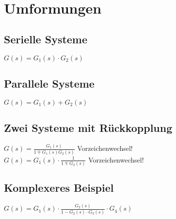 \section{Umformungen}
 \begin{multicols}{2}
	\subsection{Serielle Systeme}
		
		$G(s) = G_1(s) \cdot G_2(s)$
	\subsection{Parallele Systeme}
		
		$G(s) = G_1(s) + G_2(s)$
	\subsection{Zwei Systeme mit Rückkopplung}
		\newline
		$G(s) = \frac{G_1(s)}{1 \mp G_1(s) G_2(s)}$ Vorzeichenwechsel! \\
		
		\newline
		$G(s) = G_1(s) \cdot \frac{1}{1 \mp G_2(s)}$ Vorzeichenwechsel!
		
  \end{multicols}
	\subsection{Komplexeres Beispiel}
		
		$G(s) = G_1(s) \cdot \frac{G_2(s)}{1-G_2(s) \cdot G_3(s)} \cdot G_4(s)$

